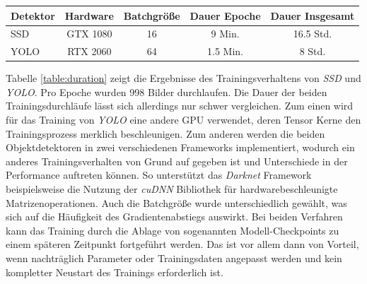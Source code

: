 \begin{center}
	\begin{tabular}[H]{l|c|c|c|c}
		Detektor & Hardware & Batchgröße & Dauer Epoche & Dauer Insgesamt \\
		\hline
		SSD & GTX 1080 & 16 & 9 Min. & 16.5 Std. \\
		YOLO & RTX 2060 & 64 & 1.5 Min. & 8 Std.
	\end{tabular}
	\label{table:duration}
\end{center}

Tabelle \ref{table:duration} zeigt die Ergebnisse des Trainingsverhaltens von \textit{SSD} und \textit{YOLO}. Pro Epoche wurden 998 Bilder durchlaufen. Die Dauer der beiden Trainingsdurchläufe lässt sich allerdings nur schwer vergleichen. Zum einen wird für das Training von \textit{YOLO} eine andere GPU verwendet, deren Tensor Kerne den Trainingsprozess merklich beschleunigen. Zum anderen werden die beiden Objektdetektoren in zwei verschiedenen Frameworks implementiert, wodurch ein anderes Trainingsverhalten von Grund auf gegeben ist und Unterschiede in der Performance auftreten können. So unterstützt das \textit{Darknet} Framework beispielsweise die Nutzung der \textit{cuDNN} Bibliothek für hardwarebeschleunigte Matrizenoperationen. Auch die Batchgröße wurde unterschiedlich gewählt, was sich auf die Häufigkeit des Gradientenabstiegs auswirkt. Bei beiden Verfahren kann das Training durch die Ablage von sogenannten Modell-Checkpoints zu einem späteren Zeitpunkt fortgeführt werden. Das ist vor allem dann von Vorteil, wenn nachträglich Parameter oder Trainingsdaten angepasst werden und kein kompletter Neustart des Trainings erforderlich ist.
